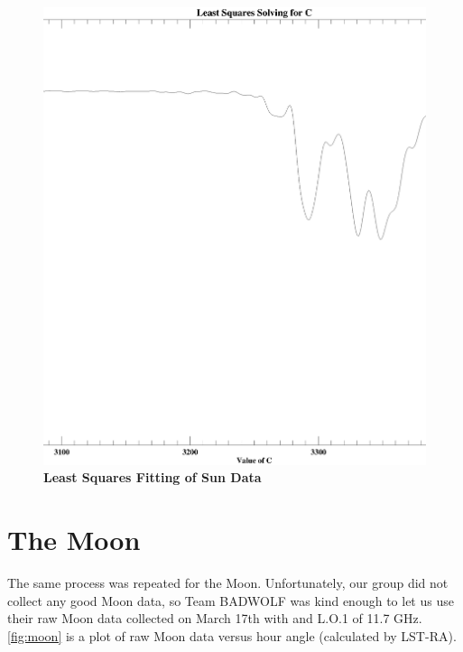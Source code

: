 \documentclass{article}
\begin{document}
\begin{figure}[h!]
 \begin{center}
    \includegraphics[width=6in]{LS.ps}
    \caption{\bf{Least Squares Fitting of Sun Data}}
    \label{fig:ls_sun}
     \end{center}
    \end{figure}
    
    
\section{The Moon}

The same process was repeated for the Moon. Unfortunately, our group did not collect any good Moon data, so Team BADWOLF was kind enough to let us use their raw Moon data collected on March 17th with and L.O.1 of 11.7 GHz.  \autoref{fig:moon} is a plot of raw Moon data versus hour angle (calculated by LST-RA).
\end{document}
